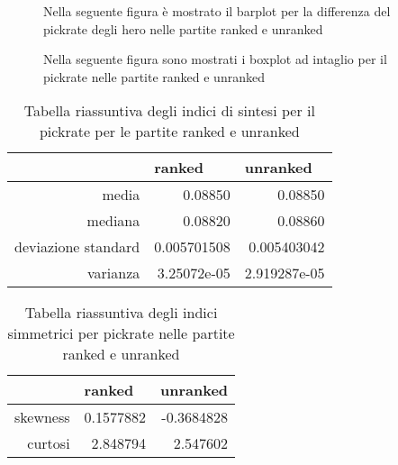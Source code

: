 \begin{figure}[htbp]
\begin{center}
\hspace*{-0.15\linewidth}

\caption{Nella seguente figura è mostrato il barplot per la differenza del pickrate degli hero nelle partite ranked e unranked}
\label{differenza_pickrate_ranked_unranked_sintetico}
\end{center}
\end{figure}
\begin{figure}[htbp]
\begin{center}

\caption{Nella seguente figura sono mostrati i boxplot ad intaglio per il pickrate nelle partite ranked e unranked}
\label{boxplot_pickrate_sintetico}
\end{center}
\end{figure}
\begin{table}
\centering
\caption{Tabella riassuntiva degli indici di sintesi per il pickrate per le partite ranked e unranked}
\label{indici_sintesi_pickrate_sintetico}
\begin{tabular}{|r|r|r|}
\hline
\multicolumn{1}{|l|}{} & \multicolumn{1}{l|}{ranked} & \multicolumn{1}{l|}{unranked} \\ \hline
media               &  0.08850  &   0.08850 \\ \hline
mediana             &  0.08820  &  0.08860 \\ \hline
deviazione standard &  0.005701508  &   0.005403042 \\ \hline
varianza            &  3.25072e-05  &   2.919287e-05 \\ \hline
\end{tabular}
\end{table}
\begin{table}
\centering
\caption{Tabella riassuntiva degli indici simmetrici per pickrate nelle partite ranked e unranked}
\label{indici_simmetrici_pickrate_sintetico}
\begin{tabular}{|r|r|r|}
\hline
\multicolumn{1}{|l|}{} & \multicolumn{1}{l|}{ranked} & \multicolumn{1}{l|}{unranked} \\ \hline
skewness    &  0.1577882  &   -0.3684828     \\ \hline
curtosi     &  2.848794  &   2.547602     \\ \hline
\end{tabular}
\end{table}
